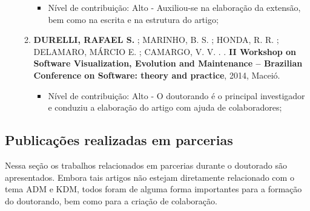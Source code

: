 \begin{itemize}
\begin{enumerate}
		\begin{itemize}
			        \item Nível de contribuição: Alto - Auxiliou-se na elaboração da extensão, bem como na escrita e na estrutura do artigo;
			    \end{itemize}
		
		\item \textbf{DURELLI, RAFAEL S.} ; MARINHO, B. S. ; HONDA, R. R. ; DELAMARO, MÁRCIO E. ; CAMARGO, V. V. . . \textbf{II Workshop on Software Visualization, Evolution and Maintenance -- Brazilian Conference on Software: theory and practice}, 2014, Maceió.
		
		    \begin{itemize}
			        \item Nível de contribuição: Alto - O doutorando é o principal investigador e conduziu a elaboração do artigo com ajuda de colaboradores;
			    \end{itemize}
\end{enumerate}
\end{itemize}

\subsection{Publicações realizadas em parcerias}

Nessa seção os trabalhos relacionados em parcerias durante o doutorado são apresentados. Embora tais artigos não estejam diretamente relacionado com o tema ADM e KDM, todos foram de alguma forma importantes para a formação do doutorando, bem como para a criação de colaboração.

